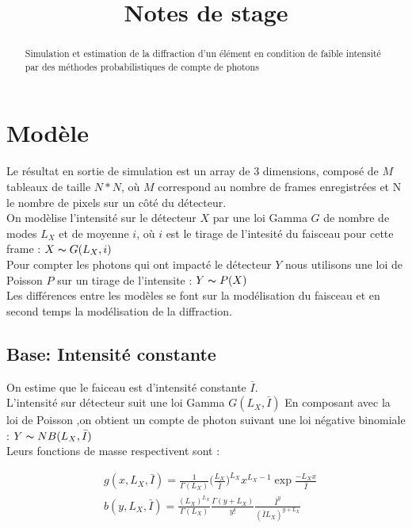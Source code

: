 \documentclass{article}
\title{Notes de stage \\}
\date{}
\begin{document}
\maketitle

\begin{abstract}
    Simulation et estimation de la diffraction d'un élément en condition de faible
    intensité par des méthodes probabilistiques de compte de photons
\end{abstract}


\section{Modèle}

Le résultat en sortie de simulation est un array de 3 dimensions, composé de $M$ tableaux de taille $N*N$, où $M$ correspond au nombre de frames enregistrées et N le nombre de pixels sur un côté du détecteur. \\
On modèlise l'intensité sur le détecteur $X$ par une loi Gamma $G$ de nombre de modes $L_X$ et de moyenne $i$, où $i$ est le tirage de l'intesité du faisceau pour cette frame : $X \thicksim G(L_X, i)$ \\
Pour compter les photons qui ont impacté le détecteur $Y$ nous utilisons une loi de Poisson $P$ sur un tirage de l'intensite : $Y \thicksim P(X)$ \\

Les différences entre les modèles se font sur la modélisation du faisceau et en second temps la modélisation de la diffraction.

\subsection{Base: Intensité constante}

On estime que le faiceau est d'intensité constante $\bar{I}$. \\
L'intensité sur détecteur suit une loi Gamma $G(L_X, \bar{I})$
En composant avec la loi de Poisson ,on obtient un compte de photon suivant une loi négative binomiale\cite[p.~81]{teich_multiply_1989} : $Y \thicksim NB(L_X, \bar{I})$ \\

Leurs fonctions de masse respectivent sont\cite[p.~83-84]{teich_multiply_1989} :

\begin{align}
    &g(x, L_X, \bar{I}) = \frac{1}{\Gamma(L_X)} \bigg( \frac{L_X}{\bar{I}} \bigg) ^{L_X} x^{L_X-1} \exp{\frac{-L_Xx}{\bar{I}}} \\
    &b(y, L_X, \bar{I}) = \frac{(L_X)^{L_X}}{\Gamma(L_X)} \frac{\Gamma(y+L_X)}{y!} \frac{\bar{I}^y}{(\bar{I} L_X)^{y+L_X}}
\end{align}
\end{document}
